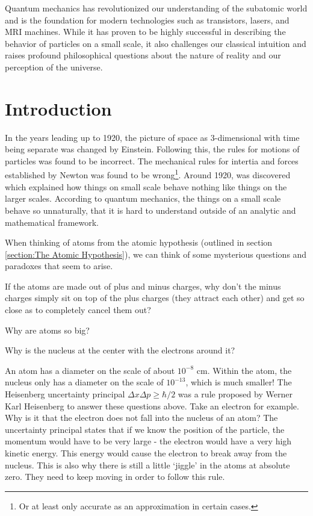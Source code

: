 Quantum mechanics has revolutionized our understanding of the subatomic world and is the foundation for modern technologies such as transistors, lasers, and MRI machines. While it has proven to be highly successful in describing the behavior of particles on a small scale, it also challenges our classical intuition and raises profound philosophical questions about the nature of reality and our perception of the universe.





\section{Introduction}

In the years leading up to 1920, the picture of space as 3-dimensional with time being separate was changed by Einstein. Following this, the rules for motions of particles was found to be incorrect. The mechanical rules for intertia and forces established by Newton was found to be wrong\footnote{Or at least only accurate as an approximation in certain cases.}. Around 1920,  was discovered which explained how things on small scale behave nothing like things on the larger scales. According to quantum mechanics, the things on a small scale behave so unnaturally, that it is hard to understand outside of an analytic and mathematical framework.

When thinking of atoms from the atomic hypothesis (outlined in section \ref{section:The Atomic Hypothesis}), we can think of some mysterious questions and paradoxes that seem to arise.

\begin{questions}
	\item If the atoms are made out of plus and minus charges, why don’t the minus charges simply sit on top of the plus charges (they attract each other) and get so close as to completely cancel them out? 
	\item Why are atoms so big? 
	\item Why is the nucleus at the center with the electrons around it?
\end{questions}

An atom has a diameter on the scale of about $10^{-8}$ cm. Within the atom, the nucleus only has a diameter on the scale of $10^{-13}$, which is much smaller! The Heisenberg uncertainty principal $\Delta x \Delta p \geq \hbar/2$ was a rule proposed by Werner Karl Heisenberg to answer these questions above. Take an electron for example. Why is it that the electron does not fall into the nucleus of an atom? The uncertainty principal states that if we know the position of the particle, the momentum would have to be very large - the electron would have a very high kinetic energy. This energy would cause the electron to break away from the nucleus. This is also why there is still a little `jiggle' in the atoms at absolute zero. They need to keep moving in order to follow this rule.

